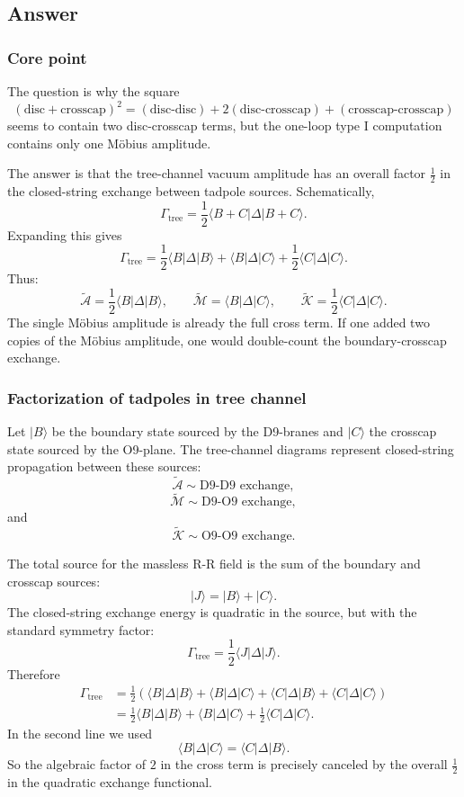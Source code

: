 \documentclass[
  10pt,
  a4paper,
  openany]{book}
\begin{document}
\subsection{Answer}\label{answer-10}

\subsubsection{Core point}\label{core-point-10}

The question is why the square \[
(\text{disc}+\text{crosscap})^2
=
(\text{disc-disc})
+
2(\text{disc-crosscap})
+
(\text{crosscap-crosscap})
\] seems to contain two disc-crosscap terms, but the one-loop type I
computation contains only one Möbius amplitude.

The answer is that the tree-channel vacuum amplitude has an overall
factor \(\frac{1}{2}\) in the closed-string exchange between tadpole
sources. Schematically, \[
\Gamma_{\mathrm{tree}}
=
\frac{1}{2}
\langle B+C|\Delta|B+C\rangle.
\] Expanding this gives \[
\Gamma_{\mathrm{tree}}
=
\frac{1}{2}\langle B|\Delta|B\rangle
+
\langle B|\Delta|C\rangle
+
\frac{1}{2}\langle C|\Delta|C\rangle.
\] Thus: \[
\tilde{\mathcal A}
=
\frac{1}{2}\langle B|\Delta|B\rangle,
\qquad
\tilde{\mathcal M}
=
\langle B|\Delta|C\rangle,
\qquad
\tilde{\mathcal K}
=
\frac{1}{2}\langle C|\Delta|C\rangle.
\] The single Möbius amplitude is already the full cross term. If one
added two copies of the Möbius amplitude, one would double-count the
boundary-crosscap exchange.

\subsubsection{Factorization of tadpoles in tree
channel}\label{factorization-of-tadpoles-in-tree-channel}

Let \(|B\rangle\) be the boundary state sourced by the D9-branes and
\(|C\rangle\) the crosscap state sourced by the O9-plane. The
tree-channel diagrams represent closed-string propagation between these
sources: \[
\tilde{\mathcal A}
\sim
\text{D9-D9 exchange},
\] \[
\tilde{\mathcal M}
\sim
\text{D9-O9 exchange},
\] and \[
\tilde{\mathcal K}
\sim
\text{O9-O9 exchange}.
\]

The total source for the massless R-R field is the sum of the boundary
and crosscap sources: \[
|J\rangle
=
|B\rangle+|C\rangle.
\] The closed-string exchange energy is quadratic in the source, but
with the standard symmetry factor: \[
\Gamma_{\mathrm{tree}}
=
\frac{1}{2}
\langle J|\Delta|J\rangle.
\] Therefore \[
\begin{aligned}
\Gamma_{\mathrm{tree}}
&=
\frac{1}{2}
\left(
\langle B|\Delta|B\rangle
+
\langle B|\Delta|C\rangle
+
\langle C|\Delta|B\rangle
+
\langle C|\Delta|C\rangle
\right)\\
&=
\frac{1}{2}\langle B|\Delta|B\rangle
+
\langle B|\Delta|C\rangle
+
\frac{1}{2}\langle C|\Delta|C\rangle.
\end{aligned}
\] In the second line we used \[
\langle B|\Delta|C\rangle
=
\langle C|\Delta|B\rangle.
\] So the algebraic factor of \(2\) in the cross term is precisely
canceled by the overall \(\frac{1}{2}\) in the quadratic exchange
functional.
\end{document}
